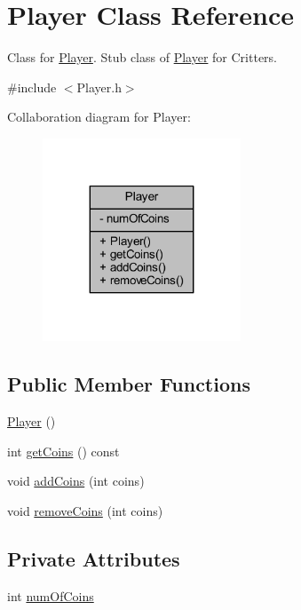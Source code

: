 \hypertarget{class_player}{\section{Player Class Reference}
\label{class_player}
}


Class for \hyperlink{class_player}{Player}. Stub class of \hyperlink{class_player}{Player} for Critters.  




{\ttfamily \#include $<$Player.\+h$>$}



Collaboration diagram for Player\+:
\nopagebreak
\begin{figure}[H]
\begin{center}
\leavevmode
\includegraphics[width=167pt]{class_player__coll__graph}
\end{center}
\end{figure}
\subsection*{Public Member Functions}
\begin{DoxyCompactItemize}
\item 
\hyperlink{class_player_affe0cc3cb714f6deb4e62f0c0d3f1fd8}{Player} ()
\item 
int \hyperlink{class_player_a1b99d8f8f5f8230ae10cbed624c93e26}{get\+Coins} () const 
\item 
void \hyperlink{class_player_afb0f01357d0f7800e43bddeec32f3f41}{add\+Coins} (int coins)
\item 
void \hyperlink{class_player_a0a01dc7b78794fba8f38815f0e159a3a}{remove\+Coins} (int coins)
\end{DoxyCompactItemize}
\subsection*{Private Attributes}
\begin{DoxyCompactItemize}
\item 
int \hyperlink{class_player_ae76f51dc1a9a1356e41669cc4dcff55c}{num\+Of\+Coins}
\end{DoxyCompactItemize}

